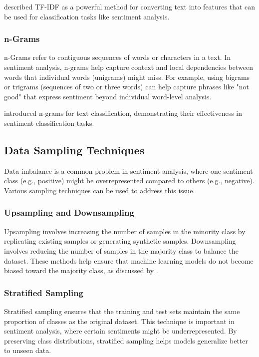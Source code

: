 \cite{Ramos2003} described TF-IDF as a powerful method for converting text into features that can be used for classification tasks like sentiment analysis.

\subsubsection{n-Grams}

n-Grams refer to contiguous sequences of words or characters in a text. In sentiment analysis, n-grams help capture context and local dependencies between words that individual words (unigrams) might miss. For example, using bigrams or trigrams (sequences of two or three words) can help capture phrases like "not good" that express sentiment beyond individual word-level analysis.

\cite{Cavnar1994} introduced n-grams for text classification, demonstrating their effectiveness in sentiment classification tasks.

\subsection{Data Sampling Techniques}

Data imbalance is a common problem in sentiment analysis, where one sentiment class (e.g., positive) might be overrepresented compared to others (e.g., negative). Various sampling techniques can be used to address this issue.

\subsubsection{Upsampling and Downsampling}

Upsampling involves increasing the number of samples in the minority class by replicating existing samples or generating synthetic samples.
Downsampling involves reducing the number of samples in the majority class to balance the dataset.
These methods help ensure that machine learning models do not become biased toward the majority class, as discussed by \cite{Chawla2002}.

\subsubsection{Stratified Sampling}

Stratified sampling ensures that the training and test sets maintain the same proportion of classes as the original dataset. This technique is important in sentiment analysis, where certain sentiments might be underrepresented. By preserving class distributions, stratified sampling helps models generalize better to unseen data.

